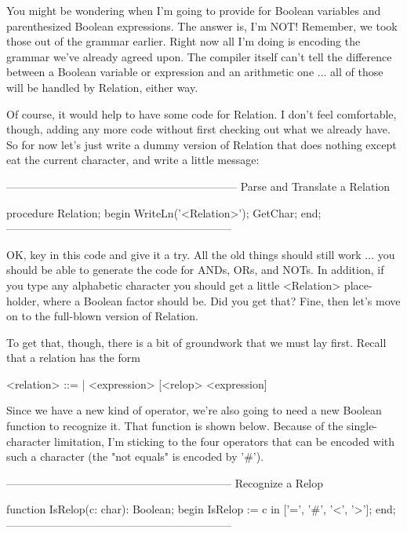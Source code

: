 \documentclass[float=false, crop=false]{standalone}
\begin{document}
You might be wondering when I'm going to provide for Boolean variables and
parenthesized Boolean expressions. The answer is, I'm NOT! Remember, we took
those out of the grammar earlier. Right now all I'm doing is encoding the
grammar we've already agreed upon. The compiler itself can't tell the difference
between a Boolean variable or expression and an arithmetic one ... all of those
will be handled by Relation, either way.

Of course, it would help to have some code for Relation. I don't feel
comfortable, though, adding any more code without first checking out what we
already have. So for now let's just write a dummy version of Relation that does
nothing except eat the current character, and write a little message:

\begin{code}
{---------------------------------------------------------------}
{ Parse and Translate a Relation }

procedure Relation;
begin
   WriteLn('<Relation>');
   GetChar;
end;
{--------------------------------------------------------------}
\end{code}

OK, key in this code and give it a try. All the old things should still work ...
you should be able to generate the code for ANDs, ORs, and NOTs. In addition, if
you type any alphabetic character you should get a little <Relation>
place-holder, where a Boolean factor should be. Did you get that? Fine, then
let's move on to the full-blown version of Relation.

To get that, though, there is a bit of groundwork that we must lay first. Recall
that a relation has the form

 <relation>     ::= | <expression> [<relop> <expression]

Since we have a new kind of operator, we're also going to need a new Boolean
function to recognize it. That function is shown below. Because of the
single-character limitation, I'm sticking to the four operators that can be
encoded with such a character (the "not equals" is encoded by '#').

\begin{code}
{--------------------------------------------------------------}
{ Recognize a Relop }

function IsRelop(c: char): Boolean;
begin
   IsRelop := c in ['=', '#', '<', '>'];
end;
{--------------------------------------------------------------}
\end{code}
\end{document}
